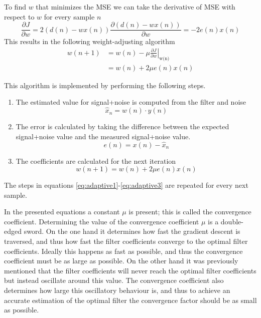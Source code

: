 To find $w$ that minimizes the MSE we can take the derivative of MSE with respect to $w$ for every sample $n$
\begin{equation}
    \frac{\partial J}{\partial w} = 2\left(d(n) - wx(n)\right) \frac{\partial\left(d(n) - wx(n)\right)}{\partial w} = -2e(n)x(n)
\end{equation}
This results in the following weight-adjusting algorithm
\begin{align}
    w(n+1) &=\left.w(n)-\mu \frac{\partial J}{\partial w}\right\rvert_\text{w(n)} \\
    &= w(n) + 2 \mu e(n)x(n)
\end{align}


This algorithm is implemented by performing the following steps. \\
\begin{enumerate}
    \item The estimated value for signal+noise is computed from the filter and noise
    \begin{equation}\label{eq:adaptive1}
        \hat{x}_n = w(n)\cdot y(n)
    \end{equation}
        \item The error is calculated by taking the difference between the expected signal+noise value and the measured signal+noise value.
    \begin{equation}\label{eq:adaptive2}
        e(n) = x(n) - \hat{x}_n
    \end{equation}
    \item The coefficients are calculated for the next iteration
    \begin{equation}\label{eq:adaptive3}
        w(n+1) = w(n) + 2 \mu e(n) x(n)
    \end{equation}
\end{enumerate}

The steps in equations \ref{eq:adaptive1}-\ref{eq:adaptive3} are repeated for every next sample.

In the presented equations a constant $\mu$ is present; this is called the convergence coefficient. Determining the value of the convergence coefficient $\mu$ is a double-edged sword. On the one hand it determines how fast the gradient descent is traversed, and thus how fast the filter coefficients converge to the optimal filter coefficients. Ideally this happens as fast as possible, and thus the convergence coefficient must be as large as possible. On the other hand it was previously mentioned that the filter coefficients will never reach the optimal filter coefficients but instead oscillate around this value. The convergence coefficient also determines how large this oscillatory behaviour is, and thus to achieve an accurate estimation of the optimal filter the convergence factor should be as small as possible. 


